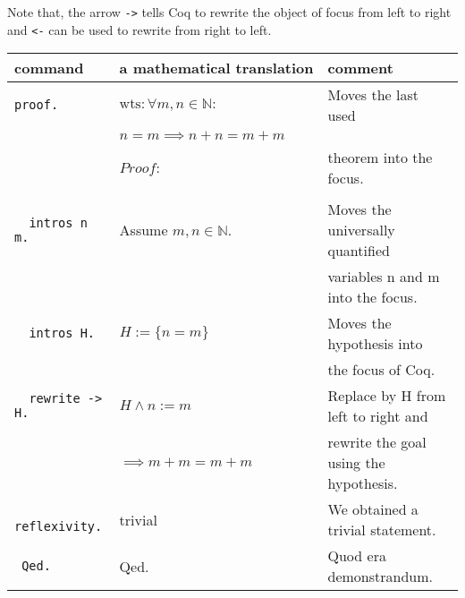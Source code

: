     
    
     Note that, the arrow \lstinline!->! tells Coq to rewrite the object of focus from left to right and \lstinline!<-! can be used to rewrite from right to left.
     
     \begin{tabular} {|l|l|l|}
     	\hline
     	  command                        & a mathematical translation          & comment \\  \hline
     	 \lstinline!proof.!              & $\text{wts}: \forall m,n \in \mathbb{N}:$ & Moves the last used \\   
     	      	                         &  $n = m \implies n+n = m+m \qquad$  &         \\     
     	      	                         &  $Proof:$                           & theorem into the focus.\\  
       	                                 &                                     &                                    \\   \hline
         \lstinline!  intros n m.!       & Assume $m,n \in \mathbb{N}.$        & Moves the universally quantified \\
                                         &                                     & variables n and m into the focus.   \\   \hline                                            
          \lstinline!  intros H.!        & $H :=\{n=m\}$                       & Moves the hypothesis into              \\ 
    	                                 &                                     & the focus of Coq.                                          \\    \hline   
     	 \lstinline!  rewrite -> H.!     &  $H \wedge n:=m$                                   & Replace by H from left to right and                            \\  
     	                                 &  $\implies m+m = m+m$& rewrite the goal using the hypothesis.           \\ \hline
     	 \lstinline!  reflexivity.!      & trivial                             &  We obtained a trivial statement.                 \\ \hline
    	 \lstinline! Qed.!                & Qed.                                &  Quod era demonstrandum.                         \\  \hline
    	 
     \end{tabular}\\
   
